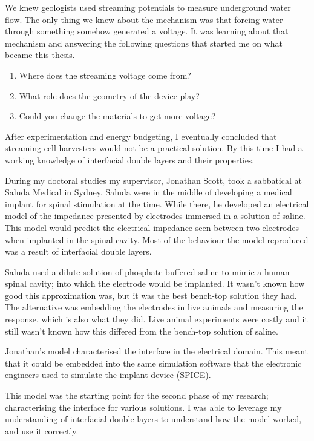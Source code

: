   We knew geologists used streaming potentials to measure underground water flow.
  The only thing we knew about the mechanism was that forcing water through something somehow generated a voltage.
  It was learning about that mechanism and answering the following questions that started me on what became this thesis.
  \begin{enumerate}
    \item Where does the streaming voltage come from?
    \item What role does the geometry of the device play?
    \item Could you change the materials to get more voltage?
  \end{enumerate}
  After experimentation and energy budgeting, I eventually concluded that streaming cell harvesters would not be a practical solution.
  By this time I had a working knowledge of interfacial double layers and their properties.

  During my doctoral studies my supervisor, Jonathan Scott, took a sabbatical at Saluda Medical in Sydney.
  Saluda were in the middle of developing a medical implant for spinal stimulation at the time.
  While there, he developed an electrical model of the impedance presented by electrodes immersed in a solution of saline.
  This model would predict the electrical impedance seen between two electrodes when implanted in the spinal cavity.
  Most of the behaviour the model reproduced was a result of interfacial double layers.

  Saluda used a dilute solution of phosphate buffered saline to mimic a human spinal cavity; into which the electrode would be implanted.
  It wasn't known how good this approximation was, but it was the best bench-top solution they had.
  The alternative was embedding the electrodes in live animals and measuring the response, which is also what they did.
  Live animal experiments were costly and it still wasn't known how this differed from the bench-top solution of saline.

  Jonathan's model characterised the interface in the electrical domain.
  This meant that it could be embedded into the same simulation software that the electronic engineers used to simulate the implant device (SPICE).

  This model was the starting point for the second phase of my research; characterising the interface for various solutions.
  I was able to leverage my understanding of interfacial double layers to understand how the model worked, and use it correctly.

